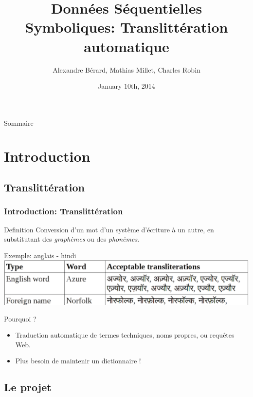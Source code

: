 \documentclass{beamer}
\title[Translittération automatique]{Données Séquentielles Symboliques: Translittération automatique}
\author[A.~Bérard, M.~Millet, C.~Robin]{Alexandre Bérard, Mathias Millet, Charles Robin}
\date{January 10th, 2014}
\begin{document}
\begin{frame}
\titlepage
\end{frame}

\begin{frame}{Sommaire}
  \tableofcontents
\end{frame}

\section{Introduction}   
 
\subsection{Translittération}
\begin{frame}
    \frametitle{Introduction: Translittération}
	\begin{block}{Definition}
        Conversion d'un mot d'un système d'écriture à un autre, en substitutant des \emph{graphèmes} ou des \emph{phonèmes}.
    \end{block}	    
    
	\begin{exampleblock}{Exemple: anglais - hindi}
	\includegraphics[scale=0.2]{en-in-example}
    \end{exampleblock}
    
	\begin{block}{Pourquoi ?}
	\begin{itemize}
		\item Traduction automatique de termes techniques, noms propres, ou requêtes Web.
		\item Plus besoin de maintenir un dictionnaire !
	\end{itemize}
	\end{block}	    
\end{frame}

\subsection{Le projet}
\end{document}
